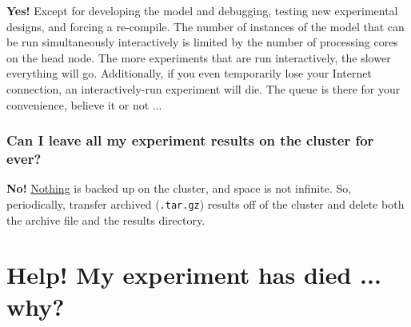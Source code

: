 \documentclass[11pt,fleqn]{book} %
\begin{document}
\textbf{Yes!} Except for developing the model and debugging, testing new experimental designs, and forcing a re-compile. The number of instances of the model that can be run simultaneously interactively is limited by the number of processing cores on the head node. The more experiments that are run interactively, the slower everything will go. Additionally, if you even temporarily lose your Internet connection, an interactively-run experiment will die. The queue is there for your convenience, believe it or not ...

\subsubsection{Can I leave all my experiment results on the cluster for ever?}

\textbf{No!} \uline{Nothing} is backed up on the cluster, and space is not infinite. So, periodically, transfer archived (\texttt{.tar.gz}) results off of the cluster and delete both the archive file and the results directory.


\newpage


\section{Help! My experiment has died ... why?}

%
\end{document}
